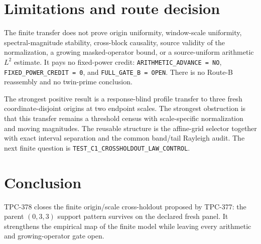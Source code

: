 \documentclass[10pt]{article}
\begin{document}
\section{Limitations and route decision}

The finite transfer does not prove origin uniformity, window-scale
uniformity, spectral-magnitude stability, cross-block causality, source
validity of the normalization, a growing masked-operator bound, or a
source-uniform arithmetic $L^2$ estimate.  It pays no fixed-power credit:
\texttt{ARITHMETIC\_ADVANCE = NO}, \texttt{FIXED\_POWER\_CREDIT = 0}, and
\texttt{FULL\_GATE\_B = OPEN}.  There is no Route-B reassembly and no
twin-prime conclusion.

The strongest positive result is a response-blind profile transfer to three
fresh coordinate-disjoint origins at two endpoint scales.  The strongest
obstruction is that this transfer remains a threshold census with
scale-specific normalization and moving magnitudes.  The reusable structure
is the affine-grid selector together with exact interval separation and the
common band/tail Rayleigh audit.  The next finite question is
\texttt{TEST\_C1\_CROSSHOLDOUT\_LAW\_CONTROL}.

\section{Conclusion}

TPC-378 closes the finite origin/scale cross-holdout proposed by TPC-377:
the parent $(0,3,3)$ support pattern survives on the declared fresh panel.
It strengthens the empirical map of the finite model while leaving every
arithmetic and growing-operator gate open.
\end{document}
